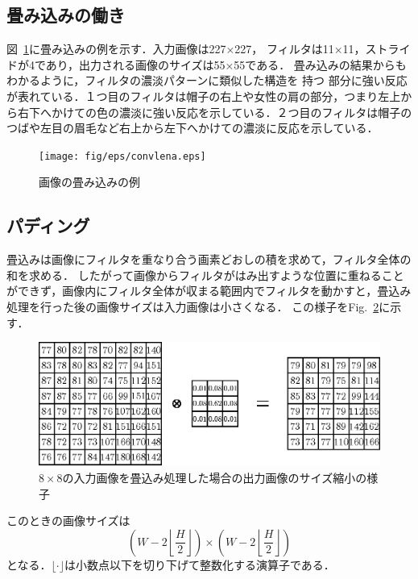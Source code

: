 \documentclass[a4paper,10pt]{jsarticle}
\begin{document}
\subsection{畳み込みの働き}
図~\ref{fig:画像の畳み込みの例}に畳み込みの例を示す．入力画像は227×227，
フィルタは11×11，ストライドが4であり，出力される画像のサイズは55×55である．
畳み込みの結果からもわかるように，フィルタの濃淡パターンに類似した構造を
持つ
部分に強い反応が表れている．１つ目のフィルタは帽子の右上や女性の肩の部分，つまり左上か
ら右下へかけての色の濃淡に強い反応を示している．２つ目のフィルタは帽子の
つばや左目の眉毛など右上から左下へかけての濃淡に反応を示している．

\begin{figure}[t]
 \centering
 \texttt{[image: fig/eps/convlena.eps]}
  \caption{画像の畳み込みの例}
  \label{fig:画像の畳み込みの例}
\end{figure}

\subsection{パディング}
畳込みは画像にフィルタを重なり合う画素どおしの積を求めて，フィルタ全体の和を求める．
したがって画像からフィルタがはみ出すような位置に重ねることができず，画像内にフィルタ全体が収まる範囲内でフィルタを動かすと，畳込み処理を行った後の画像サイズは入力画像は小さくなる．
この様子をFig.~\ref{fig:88の入力画像を畳込み処理した場合の出力画像のサイズ縮小の様子}に示す．
\begin{figure}[ht]
  \begin{center}
    \includegraphics[clip,scale=0.8]{fig/eps/convolution.eps}
  \end{center}
  \caption{$8\times 8$の入力画像を畳込み処理した場合の出力画像のサイズ縮小の様子}
  \label{fig:88の入力画像を畳込み処理した場合の出力画像のサイズ縮小の様子}
\end{figure}

このときの画像サイズは
\begin{equation}
  \left(W-2\left\lfloor \frac{H}{2}\right\rfloor\right)\times \left(W-2\left\lfloor \frac{H}{2}\right\rfloor\right)
\end{equation}
となる．$\lfloor \cdot \rfloor$は小数点以下を切り下げて整数化する演算子である．
\end{document}
